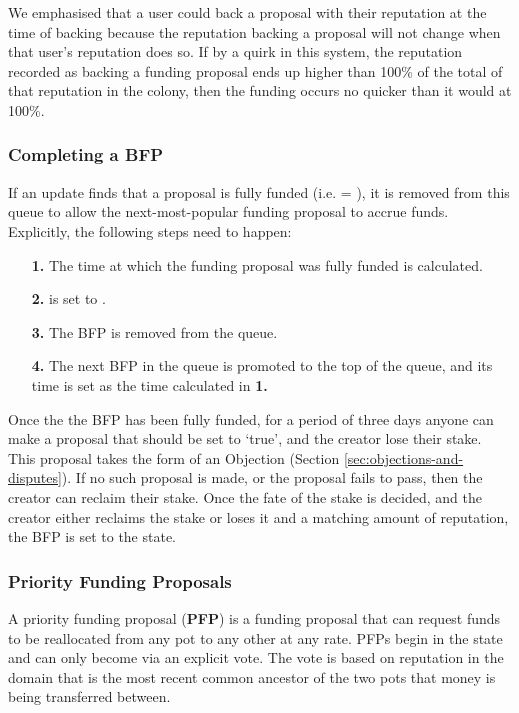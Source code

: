 We emphasised that a user could back a proposal with their reputation at the time of backing because the reputation backing a proposal will not change when that user's reputation does so. If by a quirk in this system, the reputation recorded as backing a funding proposal ends up higher than 100\% of the total of that reputation in the colony, then the funding occurs no quicker than it would at 100\%.

\subsubsection{Completing a BFP}
If an update finds that a proposal is fully funded (i.e.  = ), it is removed from this queue to allow the next-most-popular funding proposal to accrue funds. Explicitly, the following steps need to happen:
\begin{itemize}
 \item[\textbf{1.}] The time at which the funding proposal was fully funded is calculated.%
 \item[\textbf{2.}]  is set to .
 \item[\textbf{3.}] The BFP is removed from the queue.
 \item[\textbf{4.}] The next BFP in the queue is promoted to the top of the queue, and its  time is set as the time calculated in \textbf{1.}
\end{itemize}

Once the the BFP has been fully funded, for a period of three days anyone can make a proposal that  should be set to `true', and the creator lose their stake. This proposal takes the form of an Objection (Section \ref{sec:objections-and-disputes}). If no such proposal is made, or the proposal fails to pass, then the creator can reclaim their stake. Once the fate of the stake is decided, and the creator either reclaims the stake or loses it and a matching amount of reputation, the BFP is set to the  state.


\subsubsection{Priority Funding Proposals}
A priority funding proposal (\textbf{PFP}) is a funding proposal that can request funds to be reallocated from any pot to any other at any rate. PFPs begin in the  state and can only become  via an explicit vote. The vote is based on reputation in the domain that is the most recent common ancestor of the two pots that money is being transferred between.

